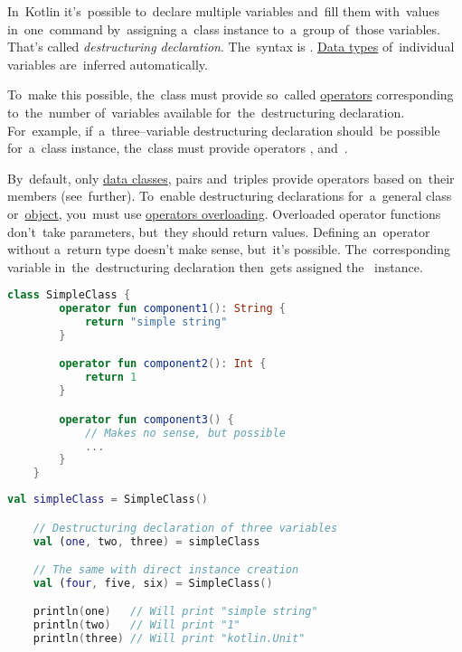 \label{kotlindestdecl}
In~Kotlin it's~possible to~declare multiple variables and~fill them with~values in~one~command by~assigning a~class instance to~a~group of~those variables.
That's called \textit{destructuring declaration}.
The~syntax is .
\hyperref[datatypes]{Data types} of~individual variables are~inferred automatically.

To~make this possible, the~class must provide so~called  \hyperref[kotlinoperator]{operators} corresponding to~the~number of~variables available for~the~destructuring declaration.
For~example, if~a~three--variable destructuring declaration should~be possible for~a~class instance, the~class must provide operators ,  and~.

By~default, only \hyperref[kotlindataclass]{data classes}, pairs and~triples provide  operators based on~their members (see~further).
To~enable destructuring declarations for~a~general class or~\hyperref[kotlinobject]{object}, you~must use \hyperref[kotlinoperatoroverload]{operators overloading}.
Overloaded operator functions don't~take parameters, but~they should return values.
Defining an~operator without a~return type doesn't make sense, but~it's possible.
The~corresponding variable in~the~destructuring declaration then~gets assigned the~ instance.

\emten
{}%
\begin{lstlisting}[language=Kotlin, title={Class supporting three \textit{componentN} operators}]
    class SimpleClass {
        operator fun component1(): String {
            return "simple string"
        }

        operator fun component2(): Int {
            return 1
        }

        operator fun component3() {
            // Makes no sense, but possible
            ...
        }
    }
\end{lstlisting}
\begin{lstlisting}[language=Kotlin, title={Destructuring declaration behavior}]
    val simpleClass = SimpleClass()

    // Destructuring declaration of three variables
    val (one, two, three) = simpleClass

    // The same with direct instance creation
    val (four, five, six) = SimpleClass()

    println(one)   // Will print "simple string"
    println(two)   // Will print "1"
    println(three) // Will print "kotlin.Unit"
\end{lstlisting}

